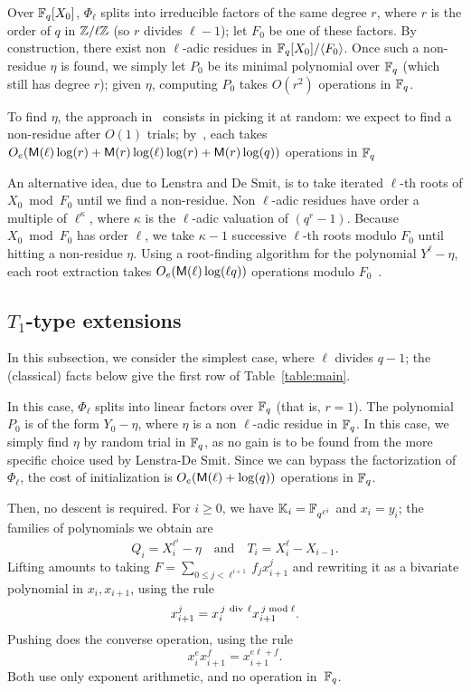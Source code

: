 \documentclass{sig-alternate}
\newcommand{\Cyc}{\Phi}  %
\begin{document}
Over $\mathbb{F}_q[X_0]$, $\Cyc_\ell$ splits into irreducible factors of the
same degree $r$, where $r$ is the order of $q$ in $\mathbb{Z}/\ell\mathbb{Z}$ (so $r$
divides $\ell-1$); let $F_0$ be one of these factors. By construction,
there exist non $\ell$-adic residues in $\mathbb{F}_q[X_0]/\langle F_0
\rangle$. Once such a non-residue $\eta$ is found, we simply let $P_0$
be its minimal polynomial over $\mathbb{F}_q$ (which still has degree $r$);
given $\eta$, computing $P_0$ takes $O(r^2)$ operations in $\mathbb{F}_q$.

To find $\eta$, the approach in~\cite{Shoup90,
  shoup94,couveignes+lercier11} consists in picking it at random: we
expect to find a non-residue after $O(1)$ trials;
by~\cite[Lemma~15]{shoup94}, each takes
$O_e(\mathsf{M}(\ell)\log(r)+\mathsf{M}(r)\log(\ell)\log(r)+\mathsf{M}(r)\log(q))$
operations in $\mathbb{F}_q$

An alternative idea, due to Lenstra and De Smit, is to take iterated
$\ell$-th roots of $X_0 \bmod F_0$ until we find a non-residue.  Non
$\ell$-adic residues have order a multiple of $\ell^\kappa$, where
$\kappa$ is the $\ell$-adic valuation of $(q^r-1)$. Because $X_0 \bmod
F_0$ has order $\ell$, we take $\kappa-1$ successive $\ell$-th roots
modulo $F_0$ until hitting a non-residue $\eta$. Using a root-finding
algorithm for the polynomial $Y^\ell-\eta$, each root extraction takes
$O_e(\mathsf{M}(\ell)\log(\ell q))$ operations modulo
$F_0$~\cite[Ch~14]{vzGG}.


\subsection{$T_1$-type extensions}\label{ssec:T1}

In this subsection, we consider the simplest case, where $\ell$
divides $q-1$; the (classical) facts below give the first row of
Table~\ref{table:main}.

In this case, $\Phi_\ell$ splits into linear factors over $\mathbb{F}_q$ (that
is, $r=1$). The polynomial $P_0$ is of the form $Y_0-\eta$, where
$\eta$ is a non $\ell$-adic residue in $\mathbb{F}_q$. In this case, we simply
find $\eta$ by random trial in $\mathbb{F}_q$, as no gain is to be found from
the more specific choice used by Lenstra-De Smit. Since we can bypass
the factorization of $\Phi_\ell$, the cost of initialization is
$O_e(\mathsf{M}(\ell)+\log(q))$ operations in $\mathbb{F}_q$.

Then, no descent is required. For $i \ge 0$, we have
$\mathbb{K}_i=\mathbb{F}_{q^{\ell^i}}$ and $x_i=y_i$; the families of polynomials we
obtain are
\begin{equation}
  \label{eq:T1}
  Q_i=X_i^{\ell^i}-\eta \quad\text{and}\quad T_i=X_{i}^\ell-X_{i-1}.
\end{equation}
Lifting amounts to taking $F = \sum_{0 \le j < \ell^{i+1}} f_j
x_{i+1}^j$ and rewriting it as a bivariate polynomial in
$x_i,x_{i+1}$, using the rule
$$x_{i+1}^j = x_i^{\,j {\rm~div~} \ell} x_{i+1}^{\,j \bmod \ell}.$$
Pushing does the converse operation, using the rule
$$x_i^e x_{i+1}^f = x_{i+1}^{e \ell + f}.$$ Both 
use only exponent arithmetic, and no operation in~$\mathbb{F}_q$. 
\end{document}
